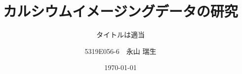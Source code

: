 \documentclass[
  leqno, %
  twoside, %
  numbers=noenddot, %
  headsepline, %
  footsepline, %
]{scrbook}
\title{カルシウムイメージングデータの研究}
\subtitle{タイトルは適当}
\author{5319E056-6　永山 瑞生}
\date{\today}
\begin{document}
\frontmatter
\maketitle

\tableofcontents

\mainmatter









\backmatter
\begin{otherlanguage}{english}
  \printbibliography[title=参考文献]
\end{otherlanguage}
\end{document}
